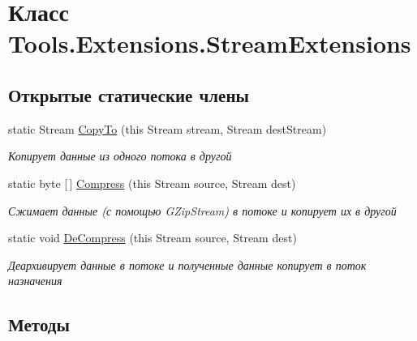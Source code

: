 \hypertarget{class_tools_1_1_extensions_1_1_stream_extensions}{}\section{Класс Tools.\+Extensions.\+Stream\+Extensions}
\label{class_tools_1_1_extensions_1_1_stream_extensions}
\subsection*{Открытые статические члены}
\begin{DoxyCompactItemize}
\item 
static Stream \hyperlink{class_tools_1_1_extensions_1_1_stream_extensions_ac7d5c6e9c74cb80aa5645882984d9497}{Copy\+To} (this Stream stream, Stream dest\+Stream)
\begin{DoxyCompactList}\small\item\em Копирует данные из одного потока в другой \end{DoxyCompactList}\item 
static byte \mbox{[}$\,$\mbox{]} \hyperlink{class_tools_1_1_extensions_1_1_stream_extensions_a8ad66fbc3f6a8110a0af982003b683b0}{Compress} (this Stream source, Stream dest)
\begin{DoxyCompactList}\small\item\em Сжимает данные (с помощью G\+Zip\+Stream) в потоке и копирует их в другой \end{DoxyCompactList}\item 
static void \hyperlink{class_tools_1_1_extensions_1_1_stream_extensions_a22c19f0b95ef6910c8645aab213e3524}{De\+Compress} (this Stream source, Stream dest)
\begin{DoxyCompactList}\small\item\em Деархивирует данные в потоке и полученные данные копирует в поток назначения \end{DoxyCompactList}\end{DoxyCompactItemize}


\subsection{Методы}
\mbox{\label{class_tools_1_1_extensions_1_1_stream_extensions_a8ad66fbc3f6a8110a0af982003b683b0}} 
